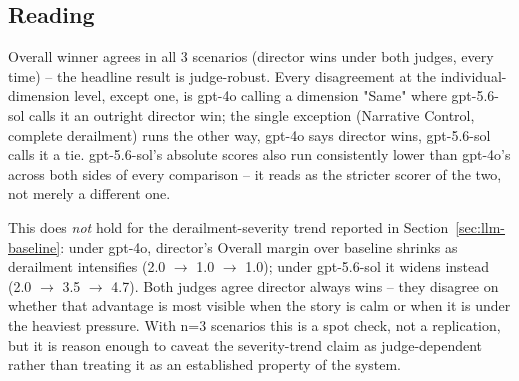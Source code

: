\documentclass[10pt]{article}
\begin{document}
\subsection{Reading}

Overall winner agrees in all 3 scenarios (director wins under both judges,
every time) -- the headline result is judge-robust. Every disagreement at
the individual-dimension level, except one, is gpt-4o calling a dimension
"Same" where gpt-5.6-sol calls it an outright director win; the single
exception (Narrative Control, complete derailment) runs the other way,
gpt-4o says director wins, gpt-5.6-sol calls it a tie. gpt-5.6-sol's
absolute scores also run consistently lower than gpt-4o's across both
sides of every comparison -- it reads as the stricter scorer of the two,
not merely a different one.

This does \emph{not} hold for the derailment-severity trend reported in
Section~\ref{sec:llm-baseline}: under gpt-4o, director's Overall margin over
baseline shrinks as derailment intensifies (2.0 $\to$ 1.0 $\to$ 1.0); under
gpt-5.6-sol it widens instead (2.0 $\to$ 3.5 $\to$ 4.7). Both judges agree
director always wins -- they disagree on whether that advantage is most
visible when the story is calm or when it is under the heaviest pressure.
With n=3 scenarios this is a spot check, not a replication, but it is
reason enough to caveat the severity-trend claim as judge-dependent rather
than treating it as an established property of the system.
\end{document}
